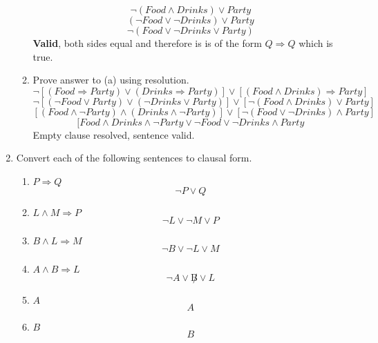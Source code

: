 \documentclass[10pt]{article}
\begin{document}
\begin{enumerate}
\begin{enumerate}
    \[\lnot (Food \wedge Drinks) \lor Party \] 
    \[(\lnot Food \lor \lnot Drinks) \lor Party \] 
    \[\lnot (Food \lor \lnot Drinks \lor Party) \] 
    \textbf{Valid}, both sides equal and therefore is is of the form $Q \Rightarrow Q$ which is true.
  \item Prove answer to (a) using resolution.
    \[ \lnot[(Food \Rightarrow Party) \lor (Drinks \Rightarrow Party)] \lor [(Food \wedge Drinks) \Rightarrow Party] \]
    \[ \lnot[(\lnot Food \lor Party) \lor (\lnot Drinks \lor Party)] \lor [\lnot (Food \wedge Drinks) \lor Party] \]
    \[ [(Food \wedge \lnot Party) \wedge (Drinks \wedge \lnot Party)] \lor [\lnot (Food \lor \lnot Drinks) \wedge Party] \]
    \[ [Food \wedge Drinks \wedge \lnot Party \lor \lnot Food \lor \lnot Drinks \wedge Party \]
    Empty clause resolved, sentence valid.
  \end{enumerate}
\item Convert each of the following sentences to clausal form.
  \begin{enumerate}
  \item $P \Rightarrow Q$
    \[ \lnot P \lor Q \]
  \item $L \wedge M \Rightarrow P$
    \[ \lnot L \lor \lnot M \lor P \]
  \item $B \wedge L \Rightarrow M$
    \[ \lnot B \lor \lnot L \lor M\]
  \item $A \wedge B \Rightarrow L$
    \[ \lnot A \lor \not B \lor L \]
  \item $A$
    \[A\]
  \item $B$
    \[B\]
  \end{enumerate}


\end{enumerate}
\end{document}
